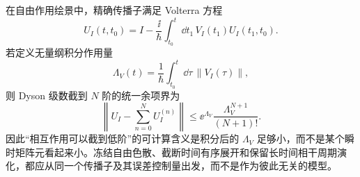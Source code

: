 在自由作用绘景中，精确传播子满足 Volterra 方程
\begin{equation}
\boxed{
U_I(t,t_0)
=I-\frac{\ii}{\hbar}\int_{t_0}^{t}\!\dd t_1\,
V_I(t_1)U_I(t_1,t_0).}
\label{eq:periodic_lattice_volterra_propagator}
\end{equation}
若定义无量纲积分作用量
\begin{equation*}
\Lambda_V(t)=\frac1\hbar\int_{t_0}^{t}\!\dd\tau\,\|V_I(\tau)\|,
\end{equation*}
则 Dyson 级数截到 $N$ 阶的统一余项界为
\begin{equation}
\boxed{
\left\|U_I-\sum_{n=0}^{N}U_I^{(n)}\right\|
\le \ee^{\Lambda_V}\frac{\Lambda_V^{N+1}}{(N+1)!}.}
\label{eq:periodic_lattice_dyson_remainder_bound}
\end{equation}
因此“相互作用可以截到低阶”的可计算含义是积分后的 $\Lambda_V$ 足够小，而不是某个瞬时矩阵元看起来小。冻结自由色散、截断时间有序展开和保留长时间相干周期演化，都应从同一个传播子及其误差控制量出发，而不是作为彼此无关的模型。

